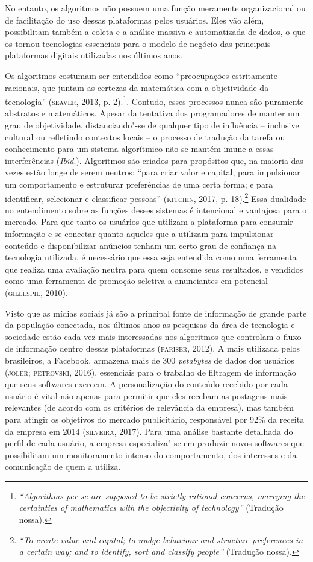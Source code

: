 No entanto, os algoritmos não possuem uma função meramente
organizacional ou de facilitação do uso dessas plataformas pelos
usuários. Eles vão além, possibilitam também a coleta e a análise
massiva e automatizada de dados, o que os tornou tecnologias essenciais
para o modelo de negócio das principais plataformas digitais utilizadas
nos últimos anos.

Os algoritmos costumam ser entendidos como ``preocupações estritamente
racionais, que juntam as certezas da matemática com a objetividade da
tecnologia'' (\textsc{seaver}, 2013, p. 2).\footnote{\emph{``Algorithms per se are supposed to be strictly
  rational concerns, marrying the certainties of mathematics with the
  objectivity of technology''} (Tradução nossa).}.
Contudo, esses processos nunca são puramente abstratos e matemáticos.
Apesar da tentativa dos programadores de manter um grau de objetividade,
distanciando"-se de qualquer tipo de influência -- inclusive cultural ou
refletindo contextos locais -- o processo de tradução da tarefa ou
conhecimento para um sistema algorítmico não se mantém imune a essas
interferências (\emph{Ibid}.). Algoritmos são criados para propósitos que, na
maioria das vezes estão longe de serem neutros: ``para criar valor e
capital, para impulsionar um comportamento e estruturar preferências de
uma certa forma; e para identificar, selecionar e classificar
pessoas'' (\textsc{kitchin}, 2017, p. 18).\footnote{\emph{``To create value and capital; to nudge behaviour and structure preferences in a certain way; and to identify, sort and classify people''} (Tradução nossa).} Essa dualidade no
entendimento sobre as funções desses sistemas é intencional e vantajosa
para o mercado. Para que tanto os usuários que utilizam a plataforma
para consumir informação e se conectar quanto aqueles que a utilizam
para impulsionar conteúdo e disponibilizar anúncios tenham um certo grau
de confiança na tecnologia utilizada, é necessário que essa seja
entendida como uma ferramenta que realiza uma avaliação neutra para quem
consome seus resultados, e vendidos como uma ferramenta de promoção
seletiva a anunciantes em potencial (\textsc{gillespie}, 2010).

Visto que as mídias sociais já são a principal fonte de informação de
grande parte da população conectada, nos últimos anos as pesquisas da
área de tecnologia e sociedade estão cada vez mais interessadas nos
algoritmos que controlam o fluxo de informação dentro dessas plataformas
(\textsc{pariser}, 2012). A mais utilizada pelos brasileiros, a Facebook,
armazena mais de 300 \emph{petabytes} de dados dos usuários
(\textsc{joler}; \textsc{petrovski}, 2016), essenciais para o trabalho de filtragem de informação que seus softwares exercem. A personalização do conteúdo recebido por cada usuário é vital
não apenas para permitir que eles recebam as postagens mais relevantes
(de acordo com os critérios de relevância da empresa), mas também para
atingir os objetivos do mercado publicitário, responsável por 92\% da
receita da empresa em 2014 (\textsc{silveira}, 2017). Para uma análise bastante
detalhada do perfil de cada usuário, a empresa especializa"-se em
produzir novos softwares que possibilitam um monitoramento intenso do
comportamento, dos interesses e da comunicação de quem a utiliza.

